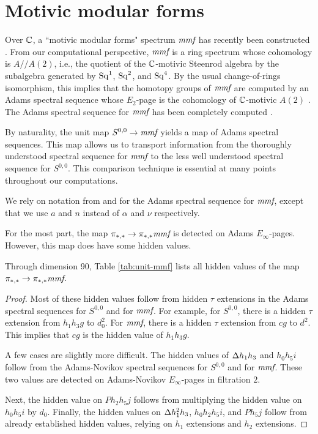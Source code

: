 \section{Motivic modular forms}
\label{sctn:mmf}

Over $\mathbb{C}$, a ``motivic modular forms" spectrum $\textit{mmf}$
has recently been constructed \cite{GIKR18}.  
From our computational perspective, $\textit{mmf}$ is a ring spectrum
whose cohomology is $A//A(2)$, i.e., the quotient of the
$\mathbb{C}$-motivic Steenrod algebra by the subalgebra generated by
$\operatorname{Sq}^1$, $\operatorname{Sq}^2$, and $\operatorname{Sq}^4$.  By the usual change-of-rings
isomorphism, this implies that the homotopy groups of $\textit{mmf}$
are computed by an Adams spectral sequence whose $E_2$-page is
the cohomology of $\mathbb{C}$-motivic $A(2)$ \cite{Isaksen09}.  
The Adams spectral sequence for
$\textit{mmf}$ has been completely computed \cite{Isaksen18}.

By naturality, the unit map $S^{0,0} \rightarrow \textit{mmf}$ 
yields a map of Adams spectral sequences.  This map allows us
to transport information from the thoroughly understood
spectral sequence for $\textit{mmf}$ to the less well understood
spectral sequence for $S^{0,0}$.  This comparison technique
is essential at many points throughout our computations.

We rely on notation from \cite{Isaksen09} and \cite{Isaksen18}
for the Adams spectral sequence for $\textit{mmf}$, 
except that we use $a$ and $n$ instead of $\alpha$ and $\nu$
respectively.

For the most part, the map $\pi_{*,*} \rightarrow \pi_{*,*} \textit{mmf}$
is detected on Adams $E_\infty$-pages.  However, this map does
have some hidden values.

\begin{thm}
\label{thm:unit-mmf}
Through dimension 90, Table \ref{tab:unit-mmf} lists
all hidden values of the map $\pi_{*,*} \rightarrow \pi_{*,*} \textit{mmf}$.
\end{thm}

\begin{proof}
Most of these hidden values follow from hidden $\tau$ extensions
in the Adams spectral sequences for $S^{0,0}$ and for $\textit{mmf}$.
For example, for $S^{0,0}$, there is a hidden $\tau$ extension
from $h_1 h_3 g$ to $d_0^2$.  For $\textit{mmf}$, there is a hidden
$\tau$ extension from $c g$ to $d^2$.  This implies that
$c g$ is the hidden value of $h_1 h_3 g$.

A few cases are slightly more difficult.  
The hidden values of $\Delta h_1 h_3$ and $h_0 h_5 i$ follow from
the Adams-Novikov spectral sequences for $S^{0,0}$ and for $\textit{mmf}$.
These two values are detected on Adams-Novikov $E_\infty$-pages
in filtration $2$.

Next, the hidden value on $P h_2 h_5 j$ follows from 
multiplying the hidden value on $h_0 h_5 i$ by $d_0$.
Finally, the hidden values on $\Delta h_1^2 h_3$, $h_0 h_2 h_5 i$,
and $P h_5 j$ follow from already established hidden values,
relying on $h_1$ extensions and $h_2$ extensions.
\end{proof}

